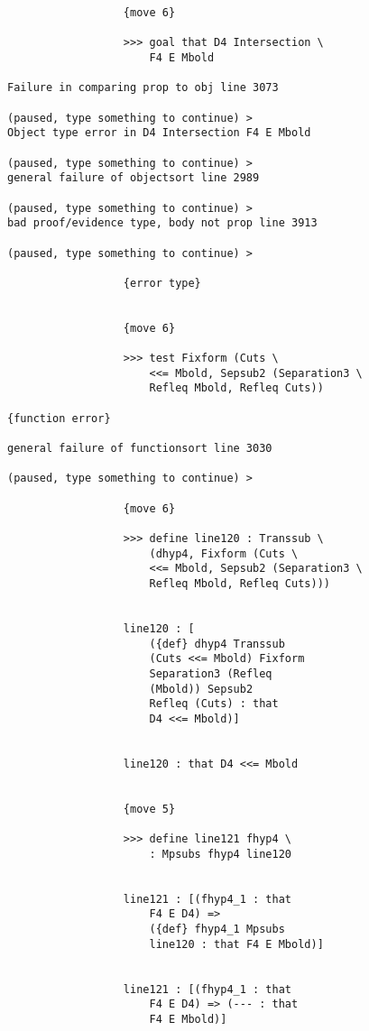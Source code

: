 \documentclass[12pt]{article}
\begin{document}
\begin{verbatim}
                  {move 6}

                  >>> goal that D4 Intersection \
                      F4 E Mbold

Failure in comparing prop to obj line 3073

(paused, type something to continue) >
Object type error in D4 Intersection F4 E Mbold

(paused, type something to continue) >
general failure of objectsort line 2989

(paused, type something to continue) >
bad proof/evidence type, body not prop line 3913

(paused, type something to continue) >

                  {error type}


                  {move 6}

                  >>> test Fixform (Cuts \
                      <<= Mbold, Sepsub2 (Separation3 \
                      Refleq Mbold, Refleq Cuts))

{function error}

general failure of functionsort line 3030

(paused, type something to continue) >

                  {move 6}

                  >>> define line120 : Transsub \
                      (dhyp4, Fixform (Cuts \
                      <<= Mbold, Sepsub2 (Separation3 \
                      Refleq Mbold, Refleq Cuts)))


                  line120 : [
                      ({def} dhyp4 Transsub 
                      (Cuts <<= Mbold) Fixform 
                      Separation3 (Refleq 
                      (Mbold)) Sepsub2 
                      Refleq (Cuts) : that 
                      D4 <<= Mbold)]


                  line120 : that D4 <<= Mbold


                  {move 5}

                  >>> define line121 fhyp4 \
                      : Mpsubs fhyp4 line120


                  line121 : [(fhyp4_1 : that 
                      F4 E D4) => 
                      ({def} fhyp4_1 Mpsubs 
                      line120 : that F4 E Mbold)]


                  line121 : [(fhyp4_1 : that 
                      F4 E D4) => (--- : that 
                      F4 E Mbold)]



\end{verbatim}
\end{document}
